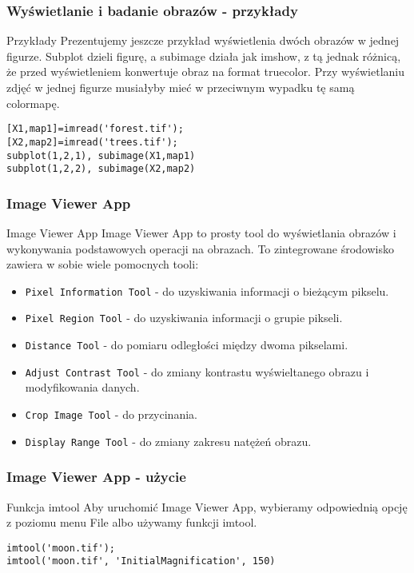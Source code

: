 \documentclass{beamer}
\begin{document}
\begin{frame}[fragile]
\frametitle{Wyświetlanie i badanie obrazów - przykłady}
\begin{block}{Przykłady}
Prezentujemy jeszcze przykład wyświetlenia dwóch obrazów w jednej figurze. Subplot dzieli figurę, a subimage działa jak imshow, z tą jednak różnicą, że przed wyświetleniem konwertuje obraz na format truecolor. Przy wyświetlaniu zdjęć w jednej figurze musiałyby mieć w przeciwnym wypadku tę samą colormapę.
\end{block}

\begin{example}
\begin{lstlisting}
[X1,map1]=imread('forest.tif');
[X2,map2]=imread('trees.tif');
subplot(1,2,1), subimage(X1,map1)
subplot(1,2,2), subimage(X2,map2)
\end{lstlisting}
\end{example}

\end{frame}

\begin{frame}[fragile]
\frametitle{Image Viewer App}
\begin{block}{Image Viewer App}
Image Viewer App to prosty tool do wyświetlania obrazów i wykonywania podstawowych operacji na obrazach. To zintegrowane środowisko zawiera w sobie wiele pomocnych tooli:
\end{block}

\begin{itemize}
  \item \texttt{Pixel Information Tool} - do uzyskiwania informacji o bieżącym pikselu.
  \item \texttt{Pixel Region Tool} - do uzyskiwania informacji o grupie pikseli.
  \item \texttt{Distance Tool} - do pomiaru odległości między dwoma pikselami.
  \item \texttt{Adjust Contrast Tool} - do zmiany kontrastu wyświeltanego obrazu i modyfikowania danych.
  \item \texttt{Crop Image Tool} - do przycinania.
  \item \texttt{Display Range Tool} - do zmiany zakresu natężeń obrazu.
\end{itemize}
\end{frame}

\begin{frame}[fragile]
\frametitle{Image Viewer App - użycie}
\begin{block}{Funkcja imtool}
Aby uruchomić Image Viewer App, wybieramy odpowiednią opcję z poziomu menu File albo używamy funkcji imtool.
\end{block}

\begin{example}
\begin{lstlisting}
imtool('moon.tif');
imtool('moon.tif', 'InitialMagnification', 150)
\end{lstlisting}
\end{example}
\end{frame}
\end{document}
